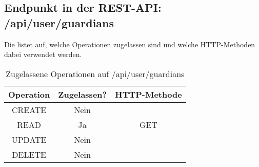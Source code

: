 \subsection{Endpunkt in der REST-API: /api/user/guardians}
Die  listet auf, welche Operationen zugelassen sind und welche HTTP-Methoden dabei verwendet werden. 

\begin{table}[!htbp]
	\begin{tabular}{|c|c|c|}
		\hline
			\textbf{Operation} & \textbf{Zugelassen?} & \textbf{HTTP-Methode} \\ \hline
			CREATE & Nein & \\ \hline 
			READ & Ja & GET \\ \hline
			UPDATE & Nein & \\ \hline 
			DELETE & Nein & \\ \hline
	\end{tabular}

		\caption{Zugelassene Operationen auf /api/user/guardians}
		\label{tab:end:rest:api:user:guardians:meth}
\end{table}

